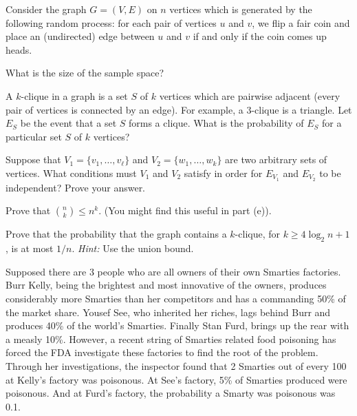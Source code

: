 \documentclass[11pt]{article}
\begin{document}

Consider the graph $G = (V,E)$ on $n$ vertices which is generated by the following random process: for each pair of vertices $u$ and $v$, we flip a fair coin and place an (undirected) edge between $u$ and $v$ if and only if the coin comes up heads.

\begin{Parts}
\Part What is the size of the sample space?

\Part A $k$-clique in a graph is a set $S$ of $k$ vertices which are pairwise adjacent (every pair of vertices is connected by an edge). For example, a $3$-clique is a triangle. Let $E_S$ be the event that a set $S$ forms a clique. What is the probability of $E_S$ for a particular set $S$ of $k$ vertices? 

\Part Suppose that $V_1 = \{v_1, \dots, v_{\ell}\}$ and $V_2 = \{w_1, \dots, w_k\}$ are two arbitrary sets of vertices. What conditions must $V_1$ and $V_2$ satisfy in order for $E_{V_1}$ and $E_{V_2}$ to be independent? Prove your answer.

\Part Prove that $\binom{n}{k} \le n^k$. (You might find this useful in part (e)).

\Part Prove that the probability that the graph contains a $k$-clique, for $k \geq 4{\log_2 n}+1$, is at most $1/n$. \textit{Hint:} Use the union bound.
\end{Parts}


Supposed there are 3 people who are all owners of their own Smarties factories. Burr Kelly, being the brightest and most innovative of the owners, produces considerably more Smarties than her competitors and has a commanding 50\% of the market share. Yousef See, who inherited her riches, lags behind Burr and produces 40\% of the world's Smarties. Finally Stan Furd, brings up the rear with a measly 10\%. However, a recent string of Smarties related food poisoning has forced the FDA investigate these factories to find the root of the problem. Through her investigations, the inspector found that 2 Smarties out of every 100 at Kelly's factory was poisonous. At See's factory, 5\% of Smarties produced were poisonous. And at Furd's factory, the probability a Smarty was poisonous was 0.1. 
\end{document}
